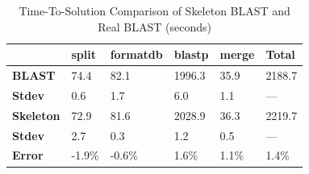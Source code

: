 \documentclass[preprint,12pt]{elsarticle}
\newcommand{\B}[1]{\textbf{#1}\xspace}
\newcommand{\HF}{\hfill}
\begin{document}

\begin{table}[t]
\begin{center}
    \caption{Time-To-Solution Comparison of Skeleton BLAST and Real BLAST (seconds)}
    \begin{scriptsize}
        \begin{tabular}{ @{} p{1.4cm} p{1.2cm} p{1.4cm} p{1.4cm} p{1.4cm} p{1.4cm} @{} }
    \toprule
             & \HF \B{split}  & \HF \B{formatdb} & \HF \B{blastp} & \HF \B{merge} & \HF \B{Total}\\ 
    \midrule
    \B{BLAST   } & \HF 74.4   & \HF 82.1     & \HF 1996.3 & \HF 35.9  & \HF 2188.7 \\
    \B{Stdev   } & \HF  0.6   & \HF  1.7     & \HF    6.0 & \HF  1.1  & \HF    --- \\
    \B{Skeleton} & \HF 72.9   & \HF 81.6     & \HF 2028.9 & \HF 36.3  & \HF 2219.7 \\
    \B{Stdev   } & \HF  2.7   & \HF  0.3     & \HF    1.2 & \HF  0.5  & \HF    --- \\
    \B{Error   } & \HF -1.9\% & \HF -0.6\%   & \HF 1.6\%  & \HF 1.1\% & \HF  1.4\% \\
    \bottomrule
    \end{tabular}
    \end{scriptsize}
    \label{tb:blast-results}
\end{center}   
\end{table}
\end{document}
